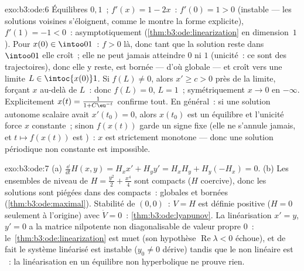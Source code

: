 \begin{solution}{exo:b3:ode:6}
Équilibres $0, 1$~; $f'(x) = 1 - 2x$~: $f'(0) = 1 > 0$
(instable --- les solutions voisines s'éloignent, comme le
montre la forme explicite), $f'(1) = -1 < 0$~:
asymptotiquement  (\cref{thm:b3:ode:linearization} en
dimension~$1$). Pour $x(0) \in \intoo01$~: $f > 0$ là, donc
tant que la solution reste dans $\intoo01$ elle croît~; elle
ne peut jamais atteindre $0$ ni $1$ (unicité~: ce sont des
trajectoires), donc elle y reste, est bornée --- d'où
globale --- et croît vers une limite $L \in
\intoc{x(0)}1$. Si $f(L) \neq 0$, alors $x' \geq c > 0$ près
de la limite, forçant $x$ au-delà de $L$~: donc $f(L) = 0$,
$L = 1$~; symétriquement $x \to 0$ en $-\infty$. Explicitement
$x(t) = \frac1{1 + C\eu^{-t}}$ confirme tout. En général~:
si une solution autonome scalaire avait $x'(t_0) = 0$, alors
$x(t_0)$ est un équilibre et l'unicité force $x$ constante~;
sinon $f(x(t))$ garde un signe fixe (elle ne s'annule jamais,
et $t \mapsto f(x(t))$ est )~: $x$ est strictement
monotone --- donc une solution périodique non constante est
impossible.
\end{solution}

\begin{solution}{exo:b3:ode:7}
(a) $\frac{\dd}{\dd t}H(x,y) = H_xx' + H_yy' = H_xH_y +
H_y(-H_x) = 0$.
(b) Les ensembles de niveau de $H = \frac{y^2}2 +
\frac{x^4}4$ sont compacts ($H$ coercive), donc les solutions
sont piégées dans des compacts~: globales et bornées
(\cref{thm:b3:ode:maximal}). Stabilité de $(0,0)$~: $V = H$
est définie positive ($H = 0$ seulement à l'origine) avec
$\dot V = 0$~: \cref{thm:b3:ode:lyapunov}. La linéarisation
$x' = y$, $y' = 0$ a la matrice nilpotente non
diagonalisable de valeur propre $0$~:
le~\cref{thm:b3:ode:linearization} est muet (son hypothèse
$\operatorname{Re}\lambda < 0$ échoue), et de fait le système
linéarisé est instable ($y_0 \ne 0$ dérive) tandis que le non
linéaire est ~: la linéarisation en un équilibre non
hyperbolique ne prouve rien.
\end{solution}

